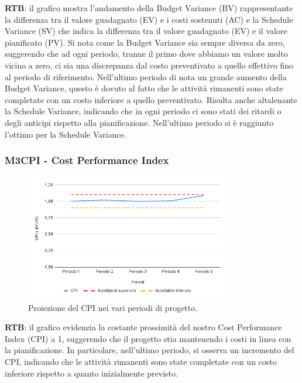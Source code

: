 \textbf{RTB}: il grafico mostra l'andamento della Budget Variance (BV) rappresentante la differenza tra il valore guadagnato (EV) e i costi sostenuti (AC) e la Schedule Variance (SV) che indica la differenza tra il valore guadagnato (EV) e il valore pianificato (PV). Si nota come la Budget Variance sia sempre diversa da zero, suggerendo che ad ogni periodo, tranne il primo dove abbiamo un valore molto vicino a zero, ci sia una discrepanza dal costo preventivato a quello effettivo fino al periodo di riferimento. Nell'ultimo periodo di nota un grande aumento della Budget Variance, questo è dovuto al fatto che le attività rimanenti sono state completate con un costo inferiore a quello preventivato. 
Risulta anche altalenante la Schedule Variance, indicando che in ogni periodo ci sono stati dei ritardi o degli anticipi rispetto alla pianificazione. Nell'ultimo periodo si è raggiunto l'ottimo per la Schedule Variance. 

\subsubsection{M3CPI - Cost Performance Index}
\begin{figure}[H]
    \centering
    \includegraphics[width=0.8\textwidth]{../Images/PianoDiQualifica/M3CPI.png}
    \caption{Proiezione del CPI nei vari periodi di progetto.}
    \label{fig:6}
\end{figure}

\textbf{RTB}: il grafico evidenzia la costante prossimità del nostro Cost Performance Index (CPI) a 1, suggerendo che il progetto stia mantenendo i costi in linea con la pianificazione. In particolare, nell'ultimo periodo, si osserva un incremento del CPI, indicando che le attività rimanenti sono state completate con un costo inferiore rispetto a quanto inizialmente previsto.

